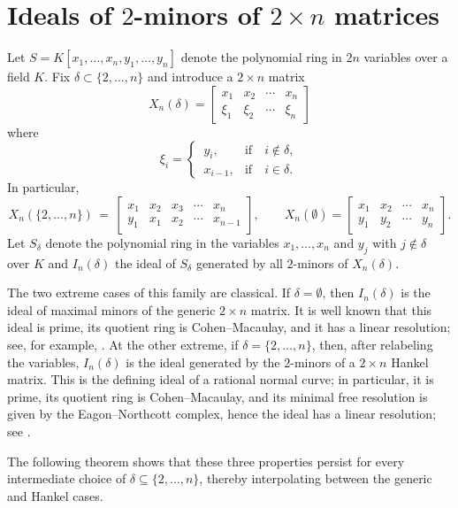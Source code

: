 \documentclass[12pt]{amsart}
\begin{document}
\section{Ideals of $2$-minors of $2 \times n$ matrices}
Let $S=K[x_1,\ldots,x_n,y_1,\ldots,y_n]$ denote the polynomial ring in $2n$ variables over a field $K$.  Fix $\delta \subset \{2, \ldots, n\}$ and introduce a $2 \times n$ matrix
$$
X_n(\delta)=
\begin{bmatrix}
   x_1 & x_2 & \cdots & x_n \\
   \xi_{1} & \xi_{2} & \cdots & \xi_{n} 
\end{bmatrix}
$$
where 
\[
\xi_i
=
\begin{cases}
\,y_i, & \text{if} \quad i \not\in \delta,\\[2pt]
\,x_{i-1},     & \text{if} \quad i \in \delta.
\end{cases}
\]
In particular, 
\[
X_n(\{2,\ldots, n\}) \, = \, 
\begin{bmatrix}
   x_1 & x_2 & x_3 & \cdots & x_n \\
   y_{1} & x_1 & x_2 & \cdots & x_{n-1}  
\end{bmatrix},
\qquad
X_n(\emptyset)=
\begin{bmatrix}
   x_1 & x_2 & \cdots & x_n \\
   y_{1} & y_{2} & \cdots & y_n  
\end{bmatrix}.
\]
Let $S_\delta$ denote the polynomial ring in the variables $x_1, \ldots, x_n$ and $y_j$ with $j \not\in \delta$ over $K$ and $I_n(\delta)$ the ideal of $S_\delta$ generated by all $2$-minors of $X_n(\delta)$. 


The two extreme cases of this family are classical. If
$\delta=\emptyset$, then $I_n(\delta)$ is the ideal of maximal minors
of the generic $2\times n$ matrix. It is well known that this ideal is
prime, its quotient ring is Cohen--Macaulay, and it has a linear
resolution; see, for example, \cite{BrunsVetter}. At the other extreme,
if $\delta=\{2,\ldots,n\}$, then, after relabeling the variables,
$I_n(\delta)$ is the ideal generated by the $2$-minors of a
$2\times n$ Hankel matrix. This is the defining ideal of a rational
normal curve; in particular, it is prime, its quotient ring is
Cohen--Macaulay, and its minimal free resolution is given by the
Eagon--Northcott complex, hence the ideal has a linear resolution;
see \cite{ConcaRNC}.

The following theorem shows that these three properties persist for
every intermediate choice of
$\delta\subseteq\{2,\ldots,n\}$, thereby interpolating between the
generic and Hankel cases.
\end{document}
